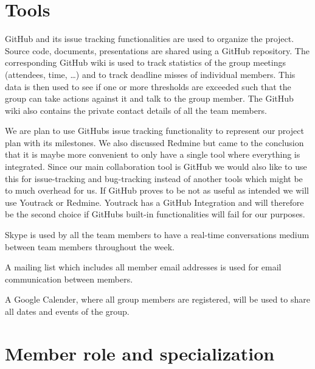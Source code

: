 \section{Tools}

GitHub and its issue tracking functionalities are used to organize the project.
Source code, documents, presentations are shared using a GitHub repository.
The corresponding GitHub wiki is used to track statistics of the group meetings (attendees, time, \dots) and to track deadline misses of individual members.
This data is then used to see if one or more thresholds are exceeded such that the group can take actions against it and talk to the group member.
The GitHub wiki also contains the private contact details of all the team members.

We are plan to use GitHubs issue tracking functionality to represent our project plan with its milestones.
We also discussed Redmine but came to the conclusion that it is maybe more convenient to only have a single tool where everything is integrated. %
Since our main collaboration tool is GitHub we would also like to use this for issue-tracking and bug-tracking instead of another tools which might be to much overhead for us.
If GitHub proves to be not as useful as intended we will use Youtrack or Redmine. Youtrack has a GitHub Integration and will therefore be the second choice if GitHubs built-in functionalities will fail for our purposes. 

Skype is used by all the team members to have a real-time conversations medium between team members throughout the week.

A mailing list which includes all member email addresses is used for email communication between members.

A Google Calender, where all group members are registered, will be used to share all dates and events of the group.

\section{Member role and specialization}

